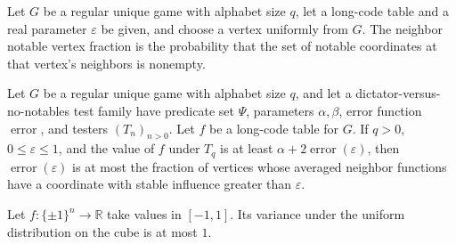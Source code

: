\begin{definition}
\label{FABL.RegularUniqueGame.neighborNotableVertexFraction}
\leanok
{}
Let $G$ be a regular unique game with alphabet size $q$, let a long-code table and a
real parameter $\varepsilon$ be given, and choose a vertex uniformly from $G$. The
neighbor notable vertex fraction is the probability that the set of notable coordinates
at that vertex's neighbors is nonempty.
\end{definition}

\begin{theorem}
\label{FABL.RegularUniqueGame.error_le_neighborNotableVertexFraction}
\leanok
{}
Let $G$ be a regular unique game with alphabet size $q$, and let a dictator-versus-no-notables test family have predicate set $\Psi$, parameters $\alpha,\beta$, error function $\operatorname{error}$, and testers $(T_n)_{n>0}$. Let $f$ be a long-code table for $G$. If $q>0$, $0\leq\varepsilon\leq1$, and the value of $f$ under $T_q$ is at least $\alpha+2\operatorname{error}(\varepsilon)$, then $\operatorname{error}(\varepsilon)$ is at most the fraction of vertices whose averaged neighbor functions have a coordinate with stable influence greater than $\varepsilon$.
\end{theorem}

\begin{theorem}
\label{FABL.RegularUniqueGame.boundedCubeFunction_variance_le_one}
\leanok
{}
Let $f:\{\pm1\}^n\to\mathbb R$ take values in $[-1,1]$. Its variance under the uniform
distribution on the cube is at most $1$.
\end{theorem}

